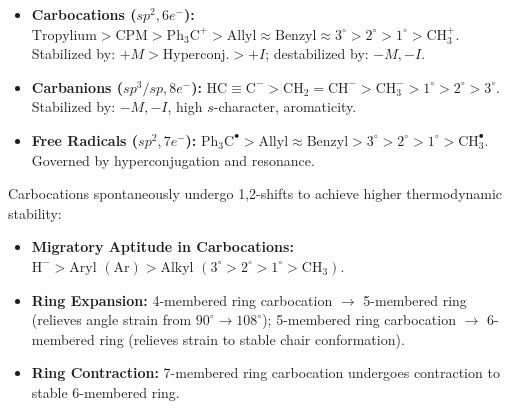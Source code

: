 \documentclass[10pt,twoside,openright]{book}
\begin{document}
\begin{formulabox}
\begin{itemize}[leftmargin=*]
  \item \textbf{Carbocations ($sp^2, 6e^-$):}
  $\text{Tropylium} > \text{CPM} > \mathrm{Ph}_3\mathrm{C}^+ > \text{Allyl} \approx \text{Benzyl} \approx 3^\circ > 2^\circ > 1^\circ > \mathrm{CH}_3^+$.\\
  Stabilized by: $+M > \text{Hyperconj.} > +I$; destabilized by: $-M, -I$.
  \item \textbf{Carbanions ($sp^3/sp, 8e^-$):}
  $\mathrm{HC\equiv C}^- > \mathrm{CH_2=CH}^- > \mathrm{CH}_3^- > 1^\circ > 2^\circ > 3^\circ$.\\
  Stabilized by: $-M, -I$, high $s$-character, aromaticity.
  \item \textbf{Free Radicals ($sp^2, 7e^-$):}
  $\mathrm{Ph}_3\mathrm{C}^\bullet > \text{Allyl} \approx \text{Benzyl} > 3^\circ > 2^\circ > 1^\circ > \mathrm{CH}_3^\bullet$.\\
  Governed by hyperconjugation and resonance.
\end{itemize}
\end{formulabox}

\begin{usecasebox}
Carbocations spontaneously undergo 1,2-shifts to achieve higher thermodynamic stability:
\begin{itemize}
  \item \textbf{Migratory Aptitude in Carbocations:} $\mathrm{H}^- > \text{Aryl } (\mathrm{Ar}) > \text{Alkyl } (3^\circ > 2^\circ > 1^\circ > \mathrm{CH}_3)$.
  \item \textbf{Ring Expansion:} 4-membered ring carbocation $\to$ 5-membered ring (relieves angle strain from $90^\circ \to 108^\circ$); 5-membered ring carbocation $\to$ 6-membered ring (relieves strain to stable chair conformation).
  \item \textbf{Ring Contraction:} 7-membered ring carbocation undergoes contraction to stable 6-membered ring.
\end{itemize}
\end{usecasebox}
\end{document}
